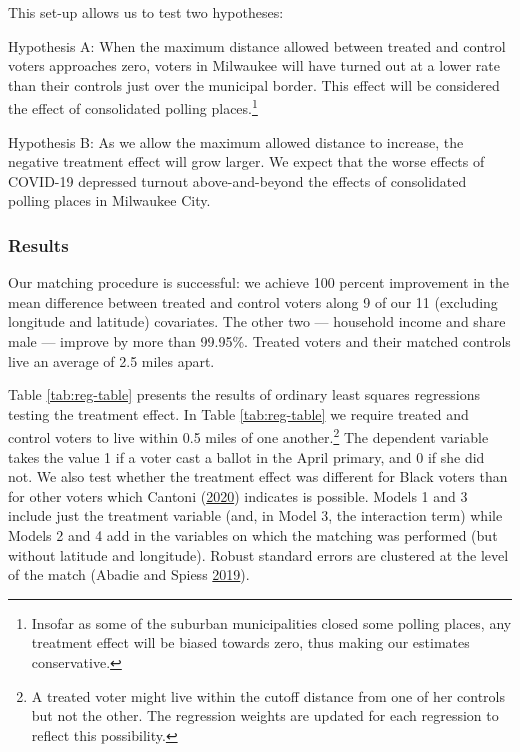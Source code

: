 \documentclass[
  12pt,
]{article}
\begin{document}
This set-up allows us to test two hypotheses:

Hypothesis A: When the maximum distance allowed between treated and control voters approaches zero, voters in Milwaukee will have turned out at a lower rate than their controls just over the municipal border. This effect will be considered the effect of consolidated polling places.\footnote{Insofar as some of the suburban municipalities closed some polling places, any treatment effect will be biased towards zero, thus making our estimates conservative.}

Hypothesis B: As we allow the maximum allowed distance to increase, the negative treatment effect will grow larger. We expect that the worse effects of COVID-19 depressed turnout above-and-beyond the effects of consolidated polling places in Milwaukee City.

\hypertarget{results}{%
\subsubsection*{Results}\label{results}}

Our matching procedure is successful: we achieve 100 percent improvement in the mean difference between treated and control voters along 9 of our 11 (excluding longitude and latitude) covariates. The other two --- household income and share male --- improve by more than 99.95\%. Treated voters and their matched controls live an average of 2.5 miles apart.

Table \ref{tab:reg-table} presents the results of ordinary least squares regressions testing the treatment effect. In Table \ref{tab:reg-table} we require treated and control voters to live within 0.5 miles of one another.\footnote{A treated voter might live within the cutoff distance from one of her controls but not the other. The regression weights are updated for each regression to reflect this possibility.} The dependent variable takes the value 1 if a voter cast a ballot in the April primary, and 0 if she did not. We also test whether the treatment effect was different for Black voters than for other voters which Cantoni (\protect\hyperlink{ref-Cantoni2020}{2020}) indicates is possible. Models 1 and 3 include just the treatment variable (and, in Model 3, the interaction term) while Models 2 and 4 add in the variables on which the matching was performed (but without latitude and longitude). Robust standard errors are clustered at the level of the match (Abadie and Spiess \protect\hyperlink{ref-Abadie2019}{2019}).
\end{document}
